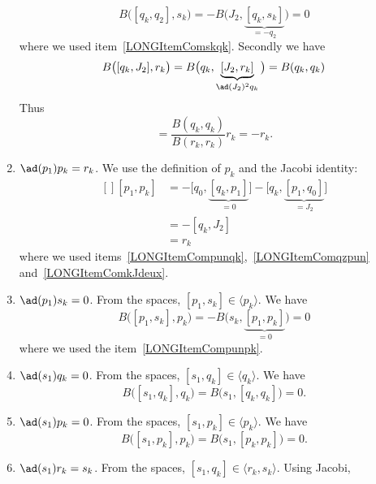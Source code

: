 \begin{enumerate}
	      \begin{equation}
		      B\big( [q_k,q_2],s_k \big)=-B\big( J_2,\underbrace{[q_k,s_k]}_{=-q_2} \big)=0
	      \end{equation}
	      where we used item~\ref{LONGItemComskqk}. Secondly we have
	      \begin{equation}
		      B\big( [q_k,J_2],r_k \big)=B\big( q_k,\underbrace{[J_2,r_k]}_{\ad(J_2)^2q_k} \big)=B(q_k,q_k)
	      \end{equation}
	      Thus
	      \begin{equation}
		      [q_k,J_2]=\frac{ B(q_k,q_k) }{ B(r_k,r_k) }r_k=-r_k.
	      \end{equation}
	\item$\ad(p_1)p_k=r_k$\label{LONGItemCompunpk}. We use the definition of $p_k$ and the Jacobi identity:
	      \begin{equation}
		      \begin{aligned}[]
			      [p_1,p_k] & =-\big[ q_0,\underbrace{[q_k,p_1]}_{=0} \big]-\big[ q_k,\underbrace{[p_1,q_0]}_{=J_2} \big] \\
			                & =-[q_k,J_2]                                                                                 \\
			                & =r_k
		      \end{aligned}
	      \end{equation}
	      where we used items~\ref{LONGItemCompunqk},~\ref{LONGItemComqzpun} and~\ref{LONGItemComkJdeux}.
	\item$\ad(p_1)s_k=0$. From the spaces, $[p_1,s_k]\in\langle p_k\rangle$. We have
	      \begin{equation}
		      B\big( [p_1,s_k],p_k \big)=-B\big( s_k,\underbrace{[p_1,p_k]}_{=0} \big)=0
	      \end{equation}
	      where we used the item~\ref{LONGItemCompunpk}.
	\item$\ad(s_1)q_k=0$. From the spaces, $[s_1,q_k]\in\langle q_k\rangle$. We have
	      \begin{equation}
		      B\big( [s_1,q_k],q_k \big)=B\big( s_1,[q_k,q_k] \big)=0.
	      \end{equation}
	\item$\ad(s_1)p_k=0$\label{LONGItemComsunpk}. From the spaces, $[s_1,p_k]\in\langle p_k\rangle$. We have
	      \begin{equation}
		      B\big( [s_1,p_k],p_k \big)=B\big( s_1,[p_k,p_k] \big)=0.
	      \end{equation}
	\item$\ad(s_1)r_k=s_k$. From the spaces, $[s_1,q_k]\in\langle r_k,s_k\rangle$. Using Jacobi,

\end{enumerate}
